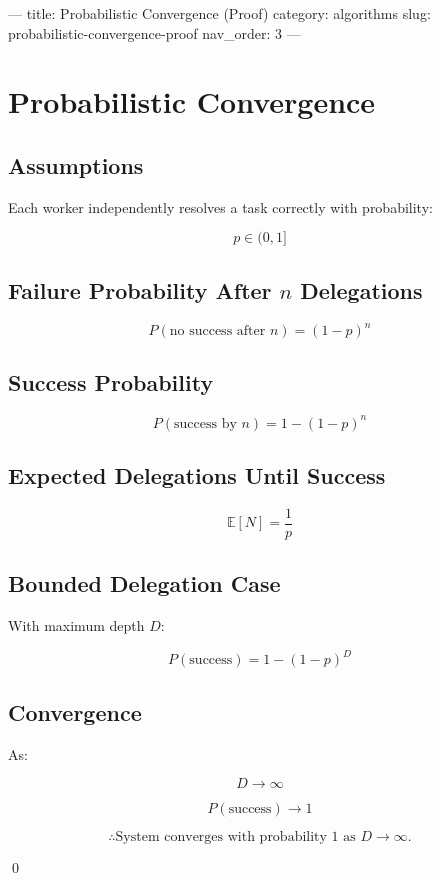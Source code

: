---
title: Probabilistic Convergence (Proof)
category: algorithms
slug: probabilistic-convergence-proof
nav_order: 3
---

\section{Probabilistic Convergence}

\subsection*{Assumptions}

Each worker independently resolves a task correctly with probability:

\[ p \in (0,1] \]

\subsection*{Failure Probability After $n$ Delegations}

\[ P(\text{no success after } n) = (1-p)^n \]

\subsection*{Success Probability}

\[ P(\text{success by } n) = 1 - (1-p)^n \]

\subsection*{Expected Delegations Until Success}

\[ \mathbb{E}[N] = \frac{1}{p} \]

\subsection*{Bounded Delegation Case}

With maximum depth $D$:

\[ P(\text{success}) = 1 - (1-p)^D \]

\subsection*{Convergence}

As:

\[ D \rightarrow \infty \]

\[ P(\text{success}) \rightarrow 1 \]

\[ \therefore \text{System converges with probability 1 as } D \to \infty. \]

\qed